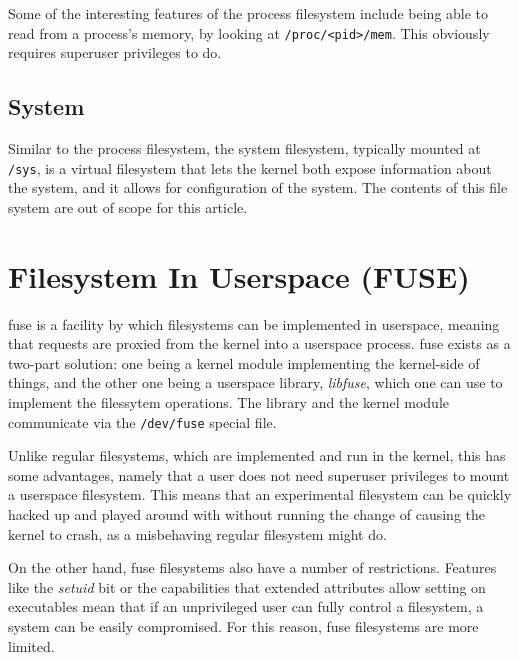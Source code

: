 \documentclass[a4paper]{article}
\begin{document}
Some of the interesting features of the process filesystem include being able to read from a process's memory, by looking at \verb|/proc/<pid>/mem|. This obviously requires superuser privileges to do.


\subsection{System}

Similar to the process filesystem, the system filesystem, typically mounted at \verb|/sys|, is a virtual filesystem that lets the kernel both expose information about the system, and it allows for configuration of the system. The contents of this file system are out of scope for this article.


\section{Filesystem In Userspace (FUSE)}

\gls{fuse} is a facility by which filesystems can be implemented in userspace, meaning that requests are proxied from the kernel into a userspace process. \gls{fuse} exists as a two-part solution: one being a kernel module implementing the kernel-side of things, and the other one being a userspace library, \emph{libfuse}, which one can use to implement the filessytem operations. The library and the kernel module communicate via the \verb|/dev/fuse| special file.

Unlike regular filesystems, which are implemented and run in the kernel, this has some advantages, namely that a user does not need superuser privileges to mount a userspace filesystem. This means that an experimental filesystem can be quickly hacked up and played around with without running the change of causing the kernel to crash, as a misbehaving regular filesystem might do. 

On the other hand, \gls{fuse} filesystems also have a number of restrictions. Features like the \emph{setuid} bit or the capabilities that extended attributes allow setting on executables mean that if an unprivileged user can fully control a filesystem, a system can be easily compromised. For this reason, \gls{fuse} filesystems are more limited.

\printglossaries

\printbibliography
\end{document}
